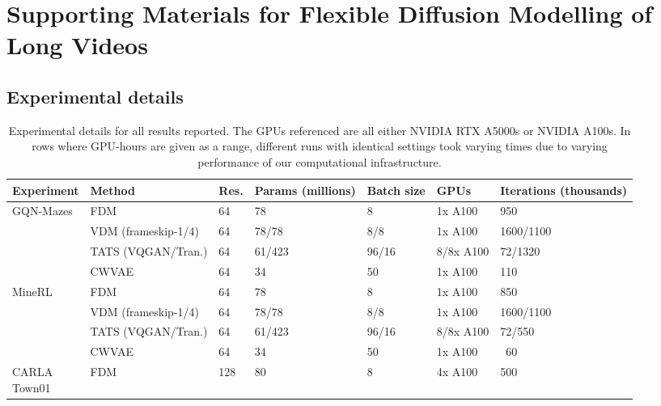 \chapter{Supporting Materials for Flexible Diffusion Modelling of Long Videos}

\section{Experimental details}
\begin{table}[t]
  \tiny
  \caption{Experimental details for all results reported. The GPUs referenced are all either NVIDIA RTX A5000s or NVIDIA A100s. In rows where GPU-hours are given as a range, different runs with identical settings took varying times due to varying performance of our computational infrastructure.}
  \label{tab:fdm-experimental-details}
  \centering
  \begin{tabular}{p{1.1cm}llp{0.9cm}p{0.6cm}lp{1cm}}
    \toprule
     Experiment  & Method & Res.  & Params (millions)  & Batch size  &  GPUs  & Iterations (thousands)\\
    \midrule
    \multirow{4}{*}{GQN-Mazes}         &  FDM                       & 64    & 78    & 8     & 1x A100   & 950       \\
                                       &  VDM (frameskip-1/4)       & 64    & 78/78 & 8/8   & 1x A100   & 1600/1100  \\
                                       &  TATS (VQGAN/Tran.)       & 64    & 61/423     & 96/16 & 8/8x A100 & 72/1320    \\
                                       &  CWVAE                     & 64    & 34    & 50    & 1x A100   & 110    \\
   \midrule
    \multirow{4}{*}{MineRL}            &  FDM                       & 64    & 78    & 8     & 1x A100   & 850       \\
                                       &  VDM (frameskip-1/4)       & 64    & 78/78 & 8/8   & 1x A100   & 1600/1100   \\
                                       &  TATS (VQGAN/Tran.)       & 64    & 61/423     & 96/16 & 8/8x A100   & 72/550    \\
                                       &  CWVAE                     & 64    & 34    & 50    & 1x A100   & ~60   \\
    \midrule
    \multirowcell{4}[0pt][l]{CARLA\\Town01}
                                       &  FDM                       & 128   & 80    & 8     & 4x A100   & 500       \\

\end{tabular}
\end{table}
